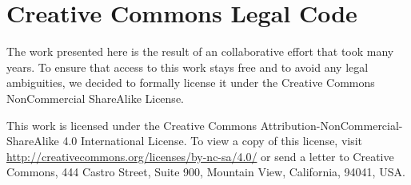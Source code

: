\section{Creative Commons Legal Code}
\label{sec:cc}        

The work presented here is the result of an collaborative effort
that took many years.  To ensure that access to this work stays free
and to avoid any legal ambiguities, we decided to formally license
it under the Creative Commons NonCommercial ShareAlike License.

This work is licensed under the Creative Commons Attribution-NonCommercial-ShareAlike 4.0 International License. To view a copy of this license, visit \url{http://creativecommons.org/licenses/by-nc-sa/4.0/} or send a letter to Creative Commons, 444 Castro Street, Suite 900, Mountain View, California, 94041, USA.